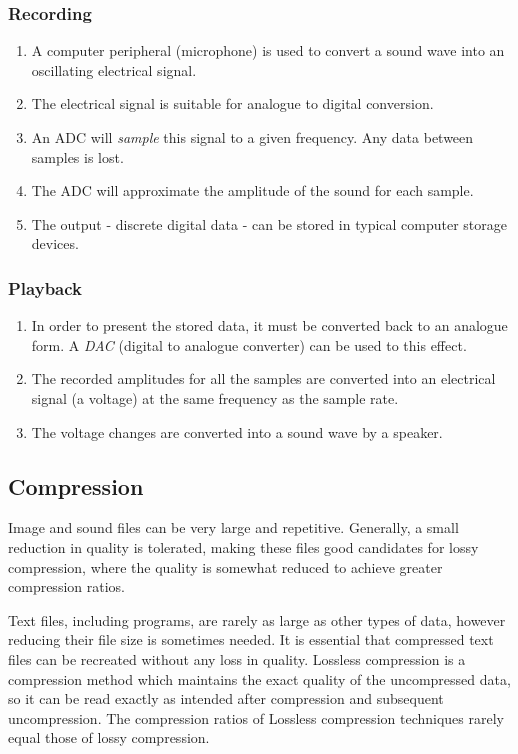 \documentclass[9pt]{article}
\begin{document}
\subsubsection{Recording}
\label{sec:org25141ec}

\begin{enumerate}
\item A computer peripheral (microphone) is used to convert a sound wave into an oscillating electrical signal.
\item The electrical signal is suitable for analogue to digital conversion.
\item An ADC will \emph{sample} this signal to a given frequency. Any data between samples is lost.
\item The ADC will approximate the amplitude of the sound for each sample.
\item The output - discrete digital data - can be stored in typical computer storage devices.
\end{enumerate}

\subsubsection{Playback}
\label{sec:orgb23afaa}

\begin{enumerate}
\item In order to present the stored data, it must be converted back to an analogue form. A \emph{DAC} (digital to analogue converter) can be used to this effect.
\item The recorded amplitudes for all the samples are converted into an electrical signal (a voltage) at the same frequency as the sample rate.
\item The voltage changes are converted into a sound wave by a speaker.
\end{enumerate}

\subsection{Compression}
\label{sec:org8ca81e5}

Image and sound files can be very large and repetitive. Generally, a small reduction in quality is tolerated, making these files good candidates for lossy compression, where the quality is somewhat reduced to achieve greater compression ratios.

Text files, including programs, are rarely as large as other types of data, however reducing their file size is sometimes needed. It is essential that compressed text files can be recreated without any loss in quality. Lossless compression is a compression method which maintains the exact quality of the uncompressed data, so it can be read exactly as intended after compression and subsequent uncompression. The compression ratios of Lossless compression techniques rarely equal those of lossy compression.
\end{document}
